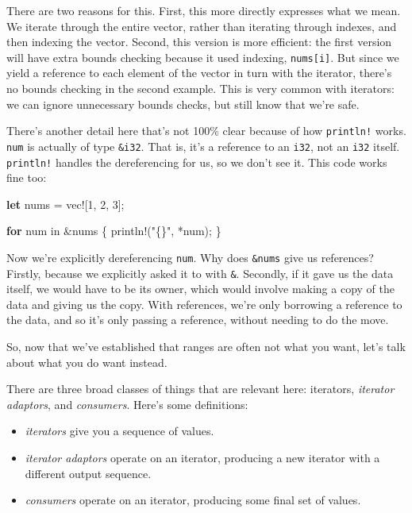 \documentclass[a4paper,]{book}
\newenvironment{Shaded}{\begin{snugshade}}{\end{snugshade}}
\newcommand{\KeywordTok}[1]{\textcolor[rgb]{0.13,0.29,0.53}{\textbf{{#1}}}}
\newcommand{\DecValTok}[1]{\textcolor[rgb]{0.00,0.00,0.81}{{#1}}}
\newcommand{\StringTok}[1]{\textcolor[rgb]{0.31,0.60,0.02}{{#1}}}
\newcommand{\OtherTok}[1]{\textcolor[rgb]{0.56,0.35,0.01}{{#1}}}
\newcommand{\NormalTok}[1]{{#1}}
\begin{document}
There are two reasons for this. First, this more directly expresses what
we mean. We iterate through the entire vector, rather than iterating
through indexes, and then indexing the vector. Second, this version is
more efficient: the first version will have extra bounds checking
because it used indexing, \texttt{nums{[}i{]}}. But since we yield a
reference to each element of the vector in turn with the iterator,
there's no bounds checking in the second example. This is very common
with iterators: we can ignore unnecessary bounds checks, but still know
that we're safe.

There's another detail here that's not 100\% clear because of how
\texttt{println!} works. \texttt{num} is actually of type
\texttt{\&i32}. That is, it's a reference to an \texttt{i32}, not an
\texttt{i32} itself. \texttt{println!} handles the dereferencing for us,
so we don't see it. This code works fine too:

\begin{Shaded}
\begin{Highlighting}[]
\KeywordTok{let} \NormalTok{nums = }\OtherTok{vec!}\NormalTok{[}\DecValTok{1}\NormalTok{, }\DecValTok{2}\NormalTok{, }\DecValTok{3}\NormalTok{];}

\KeywordTok{for} \NormalTok{num in &nums \{}
    \OtherTok{println!}\NormalTok{(}\StringTok{"\{\}"}\NormalTok{, *num);}
\NormalTok{\}}
\end{Highlighting}
\end{Shaded}

Now we're explicitly dereferencing \texttt{num}. Why does
\texttt{\&nums} give us references? Firstly, because we explicitly asked
it to with \texttt{\&}. Secondly, if it gave us the data itself, we
would have to be its owner, which would involve making a copy of the
data and giving us the copy. With references, we're only borrowing a
reference to the data, and so it's only passing a reference, without
needing to do the move.

So, now that we've established that ranges are often not what you want,
let's talk about what you do want instead.

There are three broad classes of things that are relevant here:
iterators, \emph{iterator adaptors}, and \emph{consumers}. Here's some
definitions:

\begin{itemize}
\itemsep1pt\parskip0pt
\item
  \emph{iterators} give you a sequence of values.
\item
  \emph{iterator adaptors} operate on an iterator, producing a new
  iterator with a different output sequence.
\item
  \emph{consumers} operate on an iterator, producing some final set of
  values.
\end{itemize}
\end{document}
